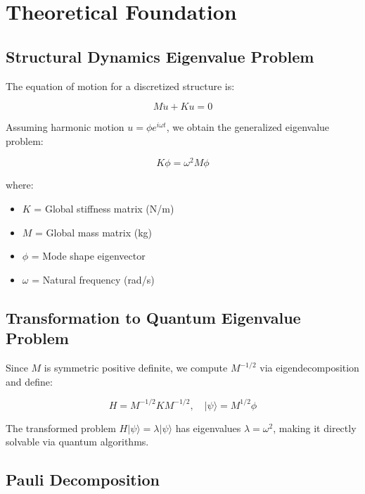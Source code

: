 \documentclass[12pt, a4paper]{article}
\begin{document}
\section{Theoretical Foundation}

\subsection{Structural Dynamics Eigenvalue Problem}

The equation of motion for a discretized structure is:

\begin{equation}
    M\ddot{u} + K u = 0
\end{equation}

Assuming harmonic motion $u = \phi e^{i\omega t}$, we obtain the generalized eigenvalue problem:

\begin{equation}
    K\phi = \omega^2 M\phi
\end{equation}

where:
\begin{itemize}[noitemsep]
    \item $K$ = Global stiffness matrix (N/m)
    \item $M$ = Global mass matrix (kg)
    \item $\phi$ = Mode shape eigenvector
    \item $\omega$ = Natural frequency (rad/s)
\end{itemize}

\subsection{Transformation to Quantum Eigenvalue Problem}

Since $M$ is symmetric positive definite, we compute $M^{-1/2}$ via eigendecomposition and define:

\begin{equation}
    H = M^{-1/2} K M^{-1/2}, \quad |\psi\rangle = M^{1/2}\phi
\end{equation}

The transformed problem $H|\psi\rangle = \lambda|\psi\rangle$ has eigenvalues $\lambda = \omega^2$, making it directly solvable via quantum algorithms.

\subsection{Pauli Decomposition}
\end{document}
